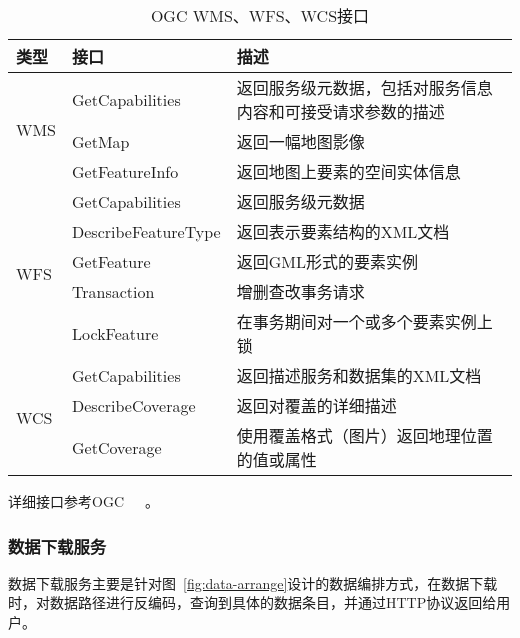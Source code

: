 \begin{table}
    \centering
    \caption{OGC WMS、WFS、WCS接口}
    \label{tab:OGC-WMS-WFS-WCS}
    \begin{threeparttable}
        \begin{tabu} to .9
            \toprule[1.5pt]
            类型 & 接口 & 描述 \\
            \midrule[1.5pt]
             & GetCapabilities & 返回服务级元数据，包括对服务信息内容和可接受请求参数的描述 \\
            \cmidrule(lr){2-3}
            & GetMap & 返回一幅地图影像 \\
            \cmidrule(lr){2-3}
            & GetFeatureInfo & 返回地图上要素的空间实体信息 \\
            \hline
             & GetCapabilities & 返回服务级元数据 \\
            \cmidrule(lr){2-3}
            & DescribeFeatureType & 返回表示要素结构的XML文档 \\
            \cmidrule(lr){2-3}
            & GetFeature & 返回GML形式的要素实例 \\
            \cmidrule(lr){2-3}
            & Transaction & 增删查改事务请求 \\
            \cmidrule(lr){2-3}
            & LockFeature & 在事务期间对一个或多个要素实例上锁 \\
            \hline
             & GetCapabilities & 返回描述服务和数据集的XML文档 \\
            \cmidrule(lr){2-3}
            & DescribeCoverage & 返回对覆盖的详细描述 \\
            \cmidrule(lr){2-3}
            & GetCoverage & 使用覆盖格式（图片）返回地理位置的值或属性 \\
            \bottomrule[1.5pt]
        \end{tabu}
        \begin{tablenotes}
            \footnotesize
            \item 详细接口参考OGC~\cite{OGC-WMS}~\cite{OGC-WFS}~\cite{OGC-WCS}。
        \end{tablenotes}
    \end{threeparttable}
\end{table}

\subsubsection{数据下载服务}
数据下载服务主要是针对图~\ref{fig:data-arrange}设计的数据编排方式，在数据下载时，对数据路径进行反编码，查询到具体的数据条目，并通过HTTP协议返回给用户。

